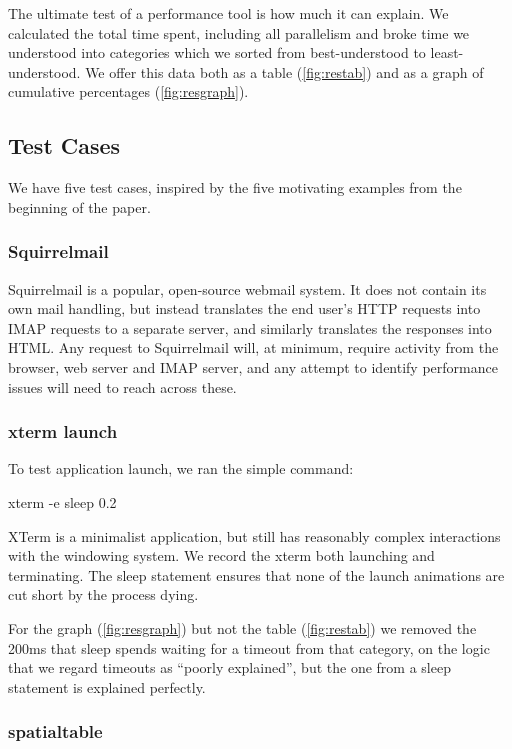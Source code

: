 \documentclass[10pt]{article}
\begin{document}
The ultimate test of a performance tool is how much it can explain.  We calculated the total time spent, including all parallelism and broke time we understood into categories which we sorted from best-understood to least-understood.  We offer this data both as a table (\ref{fig:restab}) and as a graph of cumulative percentages (\ref{fig:resgraph}).

\subsection{Test Cases}

We have five test cases, inspired by the five motivating examples from the beginning of the paper.

\subsubsection{Squirrelmail}

Squirrelmail\cite{Squirrelmail} is a popular, open-source webmail system.  It does not contain its own mail handling, but instead translates the end user's HTTP requests into IMAP requests to a separate server, and similarly translates the responses into HTML.  Any request to Squirrelmail will, at minimum, require activity from the browser, web server and IMAP server, and any attempt to identify performance issues will need to reach across these.

\subsubsection{xterm launch}

To test application launch, we ran the simple command:

\begin{tt} xterm -e sleep 0.2 \end{tt}

XTerm is a minimalist application, but still has reasonably complex interactions with the windowing system.  We record the xterm both launching and terminating.  The sleep statement ensures that none of the launch animations are cut short by the process dying.

For the graph (\ref{fig:resgraph}) but not the table (\ref{fig:restab}) we removed the 200ms that sleep spends waiting for a timeout from that category, on the logic that we regard timeouts as ``poorly explained'', but the one from a sleep statement is explained perfectly.

\subsubsection{spatialtable}
\end{document}
